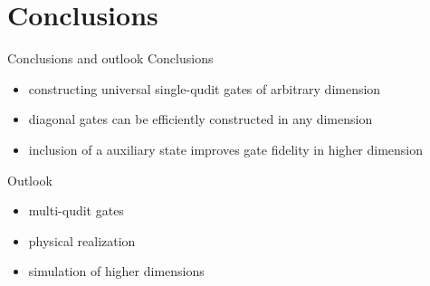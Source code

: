 \documentclass[t]{beamer}
\begin{document}
\section{Conclusions}

\begin{frame}{}
\tableofcontents[ 
currentsubsection, 
hideothersubsections, 
sectionstyle=show/shaded, 
subsectionstyle=show/shaded, 
] 
\end{frame}

\begin{frame}{Conclusions and outlook}
Conclusions
\begin{itemize}
\item constructing universal single-qudit gates of arbitrary dimension
\item diagonal gates can be efficiently constructed in any dimension
\item inclusion of a auxiliary state improves gate fidelity in higher dimension
\end{itemize}

Outlook
\begin{itemize}
\item multi-qudit gates
\item physical realization
\item simulation of higher dimensions
\end{itemize}



\end{frame}
\end{document}
